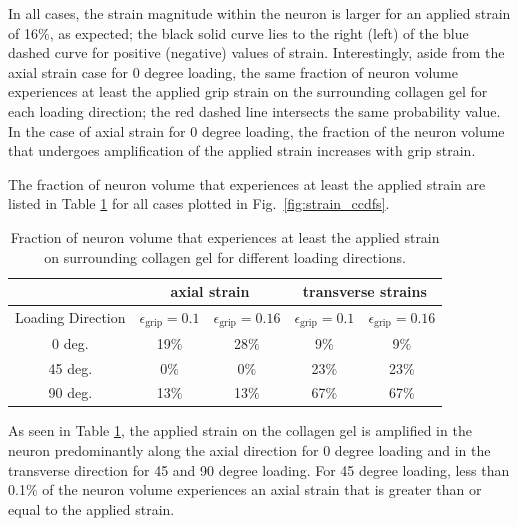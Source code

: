 \documentclass[]{interact}
\begin{document}
In all cases, the strain magnitude within the neuron is larger for an applied strain of 16$\%$, as expected; the black solid curve lies to the right (left) of the blue dashed curve for positive (negative) values of strain. Interestingly, aside from the axial strain case for 0 degree loading, the same fraction of neuron volume experiences at least the applied grip strain on the surrounding collagen gel for each loading direction; the red dashed line intersects the same probability value. In the case of axial strain for 0 degree loading, the fraction of the neuron volume that undergoes amplification of the applied strain increases with grip strain. 

The fraction of neuron volume that experiences at least the applied strain are listed in Table \ref{table:ccdf_volfrac_compare} for all cases plotted in Fig.\ \ref{fig:strain_ccdfs}.
%
\begin{table}[ht]
\begin{center}
\begin{tabular}{ c c c c c }
\hline\hline
& \multicolumn{2}{c}{axial strain} & \multicolumn{2}{c}{transverse strains} \\ \hline 
Loading Direction & $\epsilon_{\text{grip}}=0.1$ & $\epsilon_{\text{grip}}=0.16$ & $\epsilon_{\text{grip}}=0.1$ & $\epsilon_{\text{grip}}=0.16$ \\
\hline 
0 deg. & 19$\%$ & 28$\%$ & 9$\%$ & 9$\%$\\ 
45 deg. & 0$\%$ & 0$\%$ & 23$\%$ & 23$\%$\\
90 deg. & 13$\%$ & 13$\%$ & 67$\%$ & 67$\%$\\ \hline \hline
\end{tabular}
\end{center}
\caption{Fraction of neuron volume that experiences at least the applied strain on surrounding collagen gel for different loading directions.}
\label{table:ccdf_volfrac_compare}
\end{table}
%
As seen in Table \ref{table:ccdf_volfrac_compare}, the applied strain on the collagen gel is amplified in the neuron predominantly along the axial direction for 0 degree loading and in the transverse direction for 45 and 90 degree loading. For 45 degree loading, less than 0.1$\%$ of the neuron volume experiences an axial strain that is greater than or equal to the applied strain.
\end{document}
